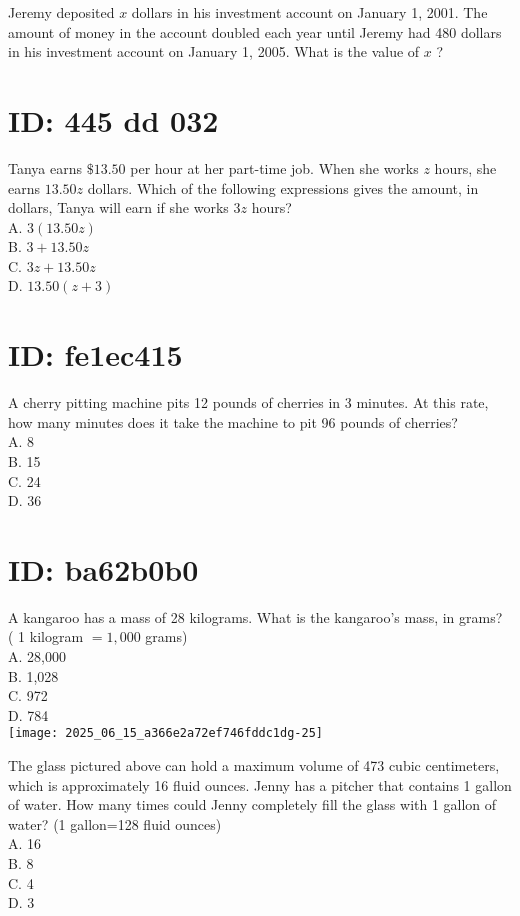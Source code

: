Jeremy deposited $x$ dollars in his investment account on January 1, 2001. The amount of money in the account doubled each year until Jeremy had 480 dollars in his investment account on January 1, 2005. What is the value of $x$ ?

\section*{ID: 445 dd 032}
Tanya earns $\$ 13.50$ per hour at her part-time job. When she works $z$ hours, she earns $13.50 z$ dollars. Which of the following expressions gives the amount, in dollars, Tanya will earn if she works $3 z$ hours?\\
A. $3(13.50 z)$\\
B. $3+13.50 z$\\
C. $3 z+13.50 z$\\
D. $13.50(z+3)$

\section*{ID: fe1ec415}
A cherry pitting machine pits 12 pounds of cherries in 3 minutes. At this rate, how many minutes does it take the machine to pit 96 pounds of cherries?\\
A. 8\\
B. 15\\
C. 24\\
D. 36

\section*{ID: ba62b0b0}
A kangaroo has a mass of 28 kilograms. What is the kangaroo's mass, in grams? ( 1 kilogram $=1,000$ grams)\\
A. 28,000\\
B. 1,028\\
C. 972\\
D. 784\\
\texttt{[image: 2025\_06\_15\_a366e2a72ef746fddc1dg-25]}

The glass pictured above can hold a maximum volume of 473 cubic centimeters, which is approximately 16 fluid ounces. Jenny has a pitcher that contains 1 gallon of water. How many times could Jenny completely fill the glass with 1 gallon of water? (1 gallon=128 fluid ounces)\\
A. 16\\
B. 8\\
C. 4\\
D. 3

